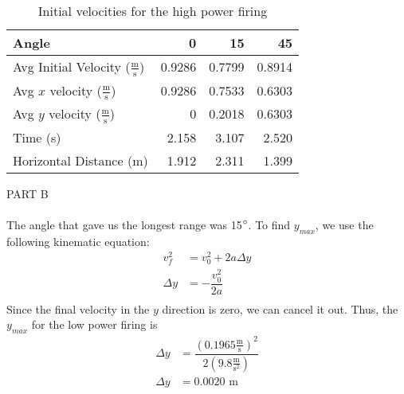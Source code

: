 \documentclass [12pt, letterpaper, twoside] {article}
\begin{document}
\begin {table}[h]
  \centering
  \begin {tabular} {| l | r | r | r |}
    \hline\hline
    Angle & 0 & 15 & 45 \\
    \hline
    Avg Initial Velocity (\(\tfrac{\text{m}}{\text{s}}\)) & 0.9286 & 0.7799 & 0.8914 \\
    \hline
    Avg \(x\) velocity (\(\tfrac{\text{m}}{\text{s}}\)) & 0.9286 & 0.7533 & 0.6303 \\
    \hline
    Avg \(y\) velocity (\(\tfrac{\text{m}}{\text{s}}\)) & 0 & 0.2018 & 0.6303 \\
    \hline
    Time (s) & 2.158 & 3.107 & 2.520 \\
    \hline
    Horizontal Distance (m) & 1.912 & 2.311 & 1.399 \\
    \hline\hline
  \end {tabular}
  \caption {Initial velocities for the high power firing}
\end {table}

\noindent
PART B \\\\
The angle that gave us the longest range was 15\(\degree\). To find \(y_{max}\), we use the following kinematic equation:
\begin {equation}
  \begin {split}
    v_{f}^2 & = v_{0}^2 + 2a\Delta{y} \\
    \Delta{y} & = -\dfrac{v_{0}^2}{2a} \\
  \end {split}
\end {equation}
Since the final velocity in the \(y\) direction is zero, we can cancel it out. Thus, the \(y_{max}\) for the low power firing is
\begin {equation}
  \begin {split}
    \Delta{y} & = \dfrac{(0.1965\tfrac{\text{m}}{\text{s}})^2}{2(9.8\tfrac{\text{m}}{\text{s}^2})}\\ 
    \Delta{y} & = 0.0020\text{ m} \\
  \end {split}
\end {equation}
\end{document}
